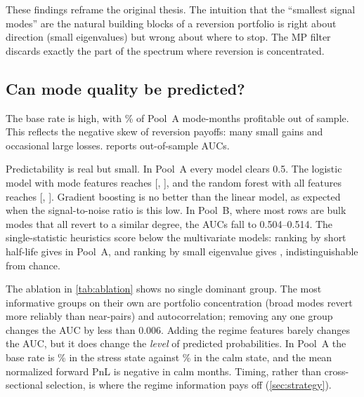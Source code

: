 These findings reframe the original thesis. The intuition that the
``smallest signal modes'' are the natural building blocks of a reversion
portfolio is right about direction (small eigenvalues) but wrong about
where to stop. The MP filter discards exactly the part of the spectrum
where reversion is concentrated.

\subsection{Can mode quality be predicted?}
\label{sec:ml-results}

The base rate is high, with \BaseRateA\% of Pool~A mode-months
profitable out of sample. This reflects the negative skew of reversion
payoffs: many small gains and occasional large losses. 
reports out-of-sample AUCs.

\begin{table}[t]
\centering\small
\caption{Out-of-sample AUC for predicting $y=\mathbf 1\{\pi_k>0\}$,
2013--2024 (\OOSRowsA{} mode-months in Pool~A, \OOSRowsB{} in Pool~B).
Brackets: 95\% intervals from a bootstrap over episodes. Heuristics
rank modes by a single in-window statistic.}
\label{tab:auc}

\end{table}

\begin{table}[t]
\centering\small
\caption{Feature-group importance for the primary (logistic, all-feature)
model. ``Solo AUC'' trains on that group alone; ``$\Delta$AUC (drop)''
is the change in out-of-sample AUC when the group is removed.}
\label{tab:ablation}

\end{table}

Predictability is real but small. In Pool~A every model clears 0.5. The
logistic model with mode features reaches \AUCLogitModeA{}
[\AUCLoLogitModeA, \AUCHiLogitModeA], and the random forest with all
features reaches \AUCRfAllA{} [\AUCLoRfAllA, \AUCHiRfAllA]. Gradient
boosting is no better than the linear model, as expected when the
signal-to-noise ratio is this low. In Pool~B, where most rows are bulk
modes that all revert to a similar degree, the AUCs fall to 0.504--0.514.
The single-statistic heuristics score below the multivariate models:
ranking by short half-life gives \AUCHeurHalfLifeA{} in Pool~A, and
ranking by small eigenvalue gives \AUCHeurLambdaA, indistinguishable
from chance.

The ablation in \cref{tab:ablation} shows no single dominant group.
The most informative groups on their own are portfolio concentration
(broad modes revert more reliably than near-pairs) and autocorrelation;
removing any one group changes the AUC by less than 0.006. Adding the
regime features barely changes the AUC, but it does change the
\emph{level} of predicted probabilities. In Pool~A the base rate is
\BaseRateAStress\% in the stress state against \BaseRateACalm\% in the
calm state, and the mean normalized forward PnL is negative in calm
months. Timing, rather than cross-sectional selection, is where the
regime information pays off (\cref{sec:strategy}).

